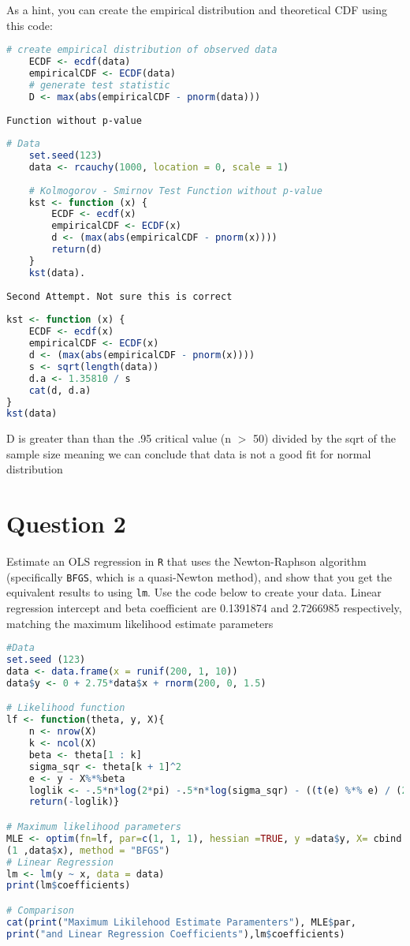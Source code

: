 \documentclass[12pt,letterpaper]{article}
\begin{document}
	
\noindent As a hint, you can create the empirical distribution and theoretical CDF using this code:

\begin{lstlisting}[language=R]
	# create empirical distribution of observed data
	ECDF <- ecdf(data)
	empiricalCDF <- ECDF(data)
	# generate test statistic
	D <- max(abs(empiricalCDF - pnorm(data))) \end{lstlisting}

\vspace{1cm}
\verb|Function without p-value|
\begin{lstlisting}[language=R]
	# Data
	set.seed(123)
	data <- rcauchy(1000, location = 0, scale = 1)
	
	# Kolmogorov - Smirnov Test Function without p-value
	kst <- function (x) {
		ECDF <- ecdf(x)
		empiricalCDF <- ECDF(x)
		d <- (max(abs(empiricalCDF - pnorm(x))))
		return(d)
	} 
	kst(data).
\end{lstlisting}

\vspace{1cm}

\verb|Second Attempt. Not sure this is correct|
\begin{lstlisting}[language=R]
kst <- function (x) {
	ECDF <- ecdf(x)
	empiricalCDF <- ECDF(x)
	d <- (max(abs(empiricalCDF - pnorm(x))))
	s <- sqrt(length(data))
	d.a <- 1.35810 / s
	cat(d, d.a)
} 
kst(data)
\end{lstlisting}

\noindent D is greater than than the .95 critical value (n $>$ 50) divided by the sqrt of the sample size 
meaning we can conclude that data is not a good fit for normal distribution
\vspace{1cm}
\section*{Question 2}
\noindent Estimate an OLS regression in \texttt{R} that uses the Newton-Raphson algorithm (specifically \texttt{BFGS}, which is a quasi-Newton method), and show that you get the equivalent results to using \texttt{lm}. Use the code below to create your data.
\vspace{.5cm}
\noindent Linear regression intercept and beta coefficient are 0.1391874 and 2.7266985 respectively, matching the maximum likelihood estimate parameters 
\begin{lstlisting}[language=R]
#Data
set.seed (123)
data <- data.frame(x = runif(200, 1, 10))
data$y <- 0 + 2.75*data$x + rnorm(200, 0, 1.5)

# Likelihood function
lf <- function(theta, y, X){
	n <- nrow(X) 
	k <- ncol(X)  
	beta <- theta[1 : k]  
	sigma_sqr <- theta[k + 1]^2  
	e <- y - X%*%beta
	loglik <- -.5*n*log(2*pi) -.5*n*log(sigma_sqr) - ((t(e) %*% e) / (2 * sigma_sqr))
	return(-loglik)}

# Maximum likelihood parameters
MLE <- optim(fn=lf, par=c(1, 1, 1), hessian =TRUE, y =data$y, X= cbind 
(1 ,data$x), method = "BFGS")
# Linear Regression 
lm <- lm(y ~ x, data = data)
print(lm$coefficients)

# Comparison
cat(print("Maximum Likilehood Estimate Paramenters"), MLE$par,
print("and Linear Regression Coefficients"),lm$coefficients)
\end{lstlisting}
\end{document}
